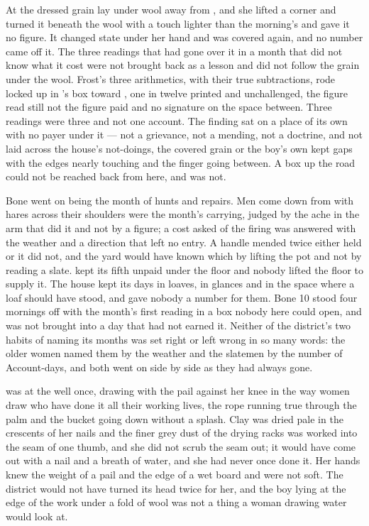 At  the dressed grain lay under wool away from , and she lifted a corner and turned it beneath the wool with a touch lighter than the morning's and gave it no figure. It changed state under her hand and was covered again, and no number came off it. The three readings that had gone over it in a month that did not know what it cost were not brought back as a lesson and did not follow the grain under the wool. Frost's three arithmetics, with their true subtractions, rode locked up  in 's box toward , one in twelve printed and unchallenged, the figure read still not the figure paid and no signature on the space between. Three readings were three and not one account. The finding sat on a place of its own with no payer under it --- not a grievance, not a mending, not a doctrine, and not laid across the house's not-doings, the covered grain or the boy's own kept gaps with the edges nearly touching and the finger going between. A box up the road could not be reached back from here, and was not.

Bone went on being the month of hunts and repairs. Men come down from  with hares across their shoulders were the month's carrying, judged by the ache in the arm that did it and not by a figure; a cost asked of the firing was answered with the weather and a direction that left no entry. A handle mended twice either held or it did not, and the yard would have known which by lifting the pot and not by reading a slate.  kept its fifth unpaid under the floor and nobody lifted the floor to supply it. The house kept its days in loaves, in glances and in the space where a loaf should have stood, and gave nobody a number for them. Bone 10 stood four mornings off with the month's first reading in a box nobody here could open, and was not brought into a day that had not earned it. Neither of the district's two habits of naming its months was set right or left wrong in so many words: the older women named them by the weather and the slatemen by the number of Account-days, and both went on side by side as they had always gone.

\scenebreak

 was at the well once, drawing with the pail against her knee in the way women draw who have done it all their working lives, the rope running true through the palm and the bucket going down without a splash. Clay was dried pale in the crescents of her nails and the finer grey dust of the drying racks was worked into the seam of one thumb, and she did not scrub the seam out; it would have come out with a nail and a breath of water, and she had never once done it. Her hands knew the weight of a pail and the edge of a wet board and were not soft. The district would not have turned its head twice for her, and the boy lying at the edge of the work under a fold of wool was not a thing a woman drawing water would look at.

